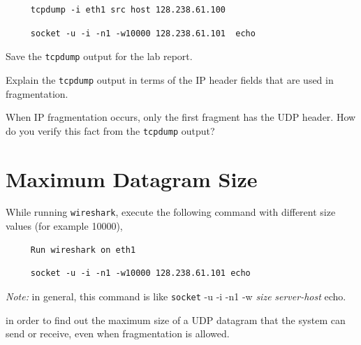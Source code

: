 \documentclass{UTNetLab}
\begin{document}
    \begin{lstlisting}
     tcpdump -i eth1 src host 128.238.61.100
    \end{lstlisting}
    
    \begin{lstlisting}
     socket -u -i -n1 -w10000 128.238.61.101  echo         
    \end{lstlisting}
    Save the \lstinline{tcpdump} output for the lab report.
    
    \begin{report}
    \item Explain the \lstinline{tcpdump} output in terms of the IP header fields that are used in fragmentation.

    \item When IP fragmentation occurs, only the first fragment has the UDP header.
    How do you verify this fact from the \lstinline{tcpdump} output?
    \end{report}


\section{Maximum Datagram Size}
\label{sec:MaxDatagramSize}
    While running \lstinline{wireshark}, execute the following command with different size values (for example 10000),
    
    \begin{lstlisting}
     Run wireshark on eth1
    \end{lstlisting}
    
    \begin{lstlisting}
     socket -u -i -n1 -w10000 128.238.61.101 echo         
    \end{lstlisting}
 
    
    \textit{Note: }in general, this command is like \lstinline{socket} -u -i -n1 -w \textit{size} \textit{server-host} echo.
    
    in order to find out the maximum size of a UDP datagram that the system can send or receive, even when fragmentation is allowed.
\end{document}
